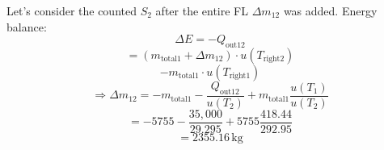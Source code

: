 Let's consider the counted \( S_2 \) after the entire FL \( \Delta m_{12} \) was added. Energy balance:
\[
\Delta E = -Q_{\text{out}12}
\]
\[
= (m_{\text{total}1} + \Delta m_{12}) \cdot u(T_{\text{right}2})
\]
\[
- m_{\text{total}1} \cdot u(T_{\text{right}1})
\]
\[
\Rightarrow \Delta m_{12} = -m_{\text{total}1} - \frac{Q_{\text{out}12}}{u(T_2)} + m_{\text{total}1} \frac{u(T_1)}{u(T_2)}
\]
\[
= -5755 - \frac{35,000}{29.295} + 5755 \frac{418.44}{292.95}
\]
\[
= 2355.16 \, \text{kg}
\]